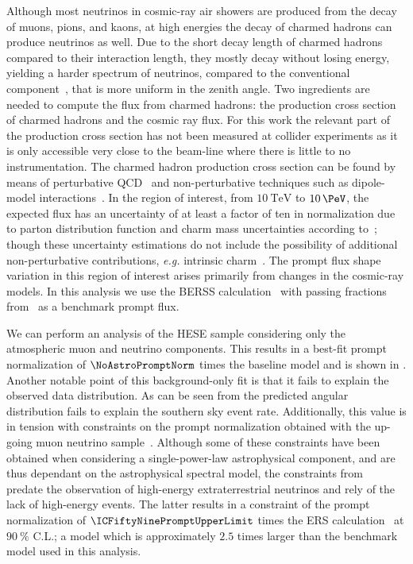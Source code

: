 Although most neutrinos in cosmic-ray air showers are produced from the decay of muons, pions, and kaons, at high energies the decay of charmed hadrons can produce neutrinos as well.
Due to the short decay length of charmed hadrons compared to their interaction length, they mostly decay without losing energy, yielding a harder spectrum of neutrinos, compared to the conventional component~\cite{gaisser2016cosmic}, that is more uniform in the zenith angle.
Two ingredients are needed to compute the flux from charmed hadrons: the production cross section of charmed hadrons and the cosmic ray flux.
For this work the relevant part of the production cross section has not been measured at collider experiments as it is only accessible very close to the beam-line where there is little to no instrumentation.
The charmed hadron production cross section can be found by means of perturbative QCD~\cite{Garzelli:2015psa,Gauld:2015kvh,Gauld:2015yia,Bhattacharya:2016jce,Garzelli:2016xmx} and non-perturbative techniques such as dipole-model interactions~\cite{Goncalves:2006ch,Enberg:2008te,Arguelles:2015wba}.
In the region of interest, from $\SI{10}\TeV$ to $\SI{10}\PeV$, the expected flux has an uncertainty of at least a factor of ten in normalization due to parton distribution function and charm mass uncertainties according to~\cite{Garzelli:2016xmx}; though these uncertainty estimations do not include the possibility of additional non-perturbative contributions, {\it e.g.} intrinsic charm~\cite{Laha:2016dri}.
The prompt flux shape variation in this region of interest arises primarily from changes in the cosmic-ray models.
In this analysis we use the BERSS calculation~\cite{Bhattacharya:2016jce} with passing fractions from~\cite{Arguelles:2018awr} as a benchmark prompt flux.

We can perform an analysis of the HESE sample considering only the atmospheric muon and neutrino components.
This results in a best-fit prompt normalization of $\NoAstroPromptNorm$ times the baseline model and is shown in .
Another notable point of this background-only fit is that it fails to explain the observed data distribution.
As can be seen from  the predicted angular distribution fails to explain the southern sky event rate.
Additionally, this value is in tension with constraints on the prompt normalization obtained with the up-going muon neutrino sample~\cite{Aartsen:2013eka,Aartsen:2015rwa,Aartsen:2016xlq}.
Although some of these constraints have been obtained when considering a single-power-law astrophysical component, and are thus dependant on the astrophysical spectral model, the constraints from~\cite{Aartsen:2013eka} predate the observation of high-energy extraterrestrial neutrinos and rely of the lack of high-energy events.
The latter results in a constraint of the prompt normalization of $\ICFiftyNinePromptUpperLimit$ times the ERS calculation~\cite{Enberg:2008te} at $\SI{90}\percent$ C.L.; a model which is approximately $2.5$ times larger than the benchmark model used in this analysis.

